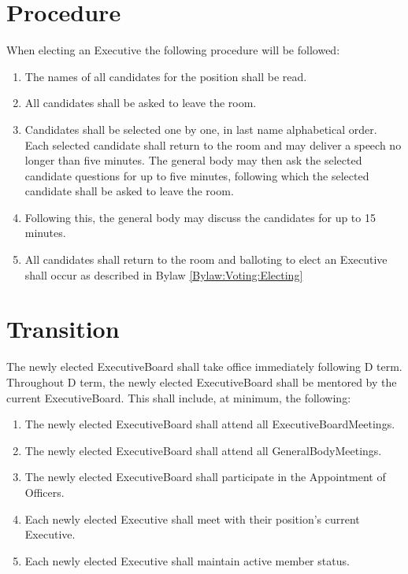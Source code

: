 \section{Procedure}\label{chap:ExecutiveBoardElectionsProcedure}
    When electing an \gls{Executive} the following procedure will be followed:
    \begin{enumerate}
        \item{The names of all candidates for the position shall be read.}
        \item{All candidates shall be asked to leave the room.}
        \item{Candidates shall be selected one by one, in last name alphabetical order. Each selected candidate shall return to the room and may deliver a speech no longer than five minutes. The general body may then ask the selected candidate questions for up to five minutes, following which the selected candidate shall be asked to leave the room.}
        \item{Following this, the general body may discuss the candidates for up to 15 minutes.}
        \item{All candidates shall return to the room and balloting to elect an \gls{Executive} shall occur as described in \Gls{Bylaw} \ref{Bylaw:Voting:Electing}}
    \end{enumerate}

\section{Transition}\label{chap:ExecutiveBoardElectionsTransistions}
    The newly elected \gls{ExecutiveBoard} shall take office immediately following D term. Throughout D term, the newly elected \gls{ExecutiveBoard} shall be mentored by the current \gls{ExecutiveBoard}. This shall include, at minimum, the following:
    \begin{enumerate}
        \item{The newly elected \gls{ExecutiveBoard} shall attend all \glspl{ExecutiveBoardMeeting}.}
        \item{The newly elected \gls{ExecutiveBoard} shall attend all \glspl{GeneralBodyMeeting}.}
        \item{The newly elected \gls{ExecutiveBoard} shall participate in the \gls{Appointment} of \glspl{Officer}.}
        \item{Each newly elected \gls{Executive} shall meet with their position's current \gls{Executive}.}
        \item{Each newly elected \gls{Executive} shall maintain active member status.}
    \end{enumerate}